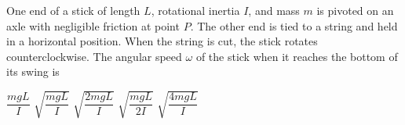 \documentclass{../../oss-apphys-exam}
\newcounter{lastmc}
\begin{document}
\begin{multicols*}{2}
\begin{questions}
    
    \question One end of a stick of length $L$, rotational inertia $I$, and
    mass $m$ is pivoted on an axle with negligible friction at point $P$. The
    other end is tied to a string and held in a horizontal position. When the
    string is cut, the stick rotates counterclockwise. The angular speed
    $\omega$ of the stick when it reaches the bottom of its swing is
    \begin{choices}
      \choice $\dfrac{mgL}I$
      \choice $\sqrt{\dfrac{mgL}I}$
      \choice $\sqrt{\dfrac{2mgL}I}$
      \choice $\sqrt{\dfrac{mgL}{2I}}$
      \choice $\sqrt{\dfrac{4mgL}I}$
    \end{choices}
  \end{questions}
  \setcounter{lastmc}{\value{question}}
\end{multicols*}
\newpage


%
\end{document}

